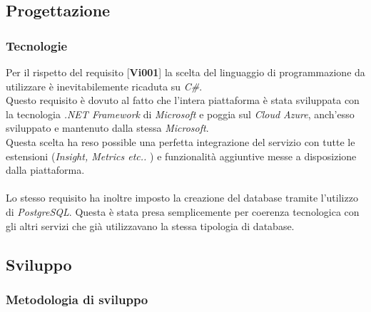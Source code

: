 \documentclass[11pt]{thesistemp}
\begin{document}
\subsection{Progettazione}



\subsubsection{Tecnologie}

Per il rispetto del requisito [\textbf{Vi001}] la scelta del linguaggio di programmazione da utilizzare è inevitabilemente ricaduta su \textit{C\#}.\\
Questo requisito è dovuto al fatto che l'intera piattaforma è stata sviluppata con la tecnologia \textit{.NET Framework} di \textit{Microsoft} e poggia sul \textit{Cloud Azure}, anch'esso sviluppato e mantenuto dalla stessa \textit{Microsoft}.\\
Questa scelta ha reso possible una perfetta integrazione del servizio con tutte le estensioni (\textit{Insight, Metrics etc.. }) e funzionalità aggiuntive messe a disposizione dalla piattaforma.\\\\
Lo stesso requisito ha inoltre imposto la creazione del database tramite l'utilizzo di \textit{PostgreSQL}. Questa è stata presa semplicemente per coerenza tecnologica con gli altri servizi che già utilizzavano la stessa tipologia di database.
\pagebreak


\pagebreak
\subsection{Sviluppo}
\subsubsection{Metodologia di sviluppo}

\pagebreak
\end{document}

